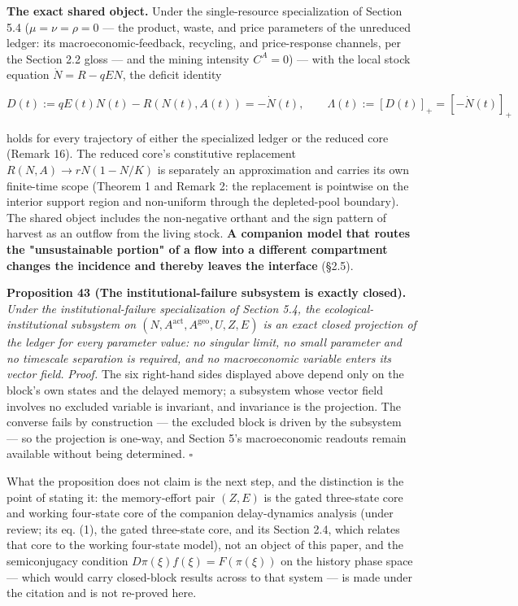 \documentclass[11pt]{article}
\begin{document}
\textbf{The exact shared object.} Under the single-resource specialization of Section 5.4 (\(\mu = \nu = \rho = 0\) --- the product, waste, and price parameters of the unreduced ledger: its macroeconomic-feedback, recycling, and price-response channels, per the Section 2.2 gloss --- and the mining intensity \(C^A = 0\)) --- with the local stock equation \(\dot N = R - qEN\), the deficit identity 

$$D(t) := qE(t)N(t) - R(N(t), A(t)) = -\dot N(t), \qquad \Lambda(t) := [D(t)]_+ = [-\dot N(t)]_+$$

 holds for every trajectory of either the specialized ledger or the reduced core (Remark 16). The reduced core's constitutive replacement \(R(N,\allowbreak{}A)\to rN(1-N/\allowbreak{}K)\) is separately an approximation and carries its own finite-time scope (Theorem 1 and Remark 2: the replacement is pointwise on the interior support region and non-uniform through the depleted-pool boundary). The shared object includes the non-negative orthant and the sign pattern of harvest as an outflow from the living stock. \textbf{A companion model that routes the "unsustainable portion" of a flow into a different compartment changes the incidence and thereby leaves the interface} (\S2.5).

\textbf{Proposition 43 (The institutional-failure subsystem is exactly closed).} \emph{Under the institutional-failure specialization of Section 5.4, the ecological-institutional subsystem on \((N,\allowbreak{} A^{\mathrm{act}},\allowbreak{} A^{\mathrm{geo}},\allowbreak{} U,\allowbreak{} Z,\allowbreak{} E)\) is an exact closed projection of the ledger for every parameter value: no singular limit, no small parameter and no timescale separation is required, and no macroeconomic variable enters its vector field.} \emph{Proof.} The six right-hand sides displayed above depend only on the block's own states and the delayed memory; a subsystem whose vector field involves no excluded variable is invariant, and invariance is the projection. The converse fails by construction --- the excluded block is driven by the subsystem --- so the projection is one-way, and Section 5's macroeconomic readouts remain available without being determined. \(\square\)

What the proposition does not claim is the next step, and the distinction is the point of stating it: the memory-effort pair \((Z, E)\) is the gated three-state core and working four-state core of the companion delay-dynamics analysis (under review; its eq. (1), the gated three-state core, and its Section 2.4, which relates that core to the working four-state model), not an object of this paper, and the semiconjugacy condition \(D\pi(\xi) f(\xi) =\allowbreak{} F(\pi(\xi))\) on the history phase space --- which would carry closed-block results across to that system --- is made under the citation and is not re-proved here.
\end{document}
